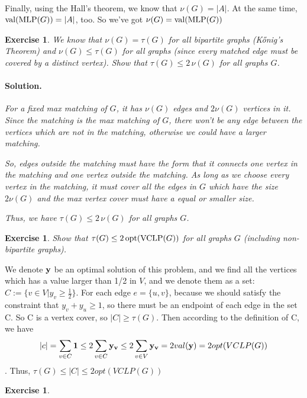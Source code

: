 \documentclass[12pt,a4]{article}
\newtheorem{exercise}[theorem]{Exercise}
\begin{document}
\paragraph{}Finally, using the Hall's theorem, we know that $\nu(G) = |A|$. At the same time, $ \textnormal{val}(\textrm{MLP}(G)) = |A|$, too. So we've got $\nu(G) = \textnormal{val}(\textrm{MLP}(G))$
\begin{exercise}
  We know that $\nu(G) = \tau(G)$ for all bipartite graphs (K\H{o}nig's Theorem) and
  $\nu(G) \leq \tau(G)$ for all graphs (since every matched edge must be covered
  by a distinct vertex). Show that $\tau(G) \leq 2 \, \nu(G)$ for all graphs $G$.   
  
\paragraph{Solution.}

For a fixed max matching of $G$, it has $\nu(G)$ edges and $2\nu(G)$ vertices in it. Since the matching is the max matching of $G$, there won't be any edge between the vertices which are not in the matching, otherwise we could have a larger matching. 

So, edges outside the matching must have the form that it connects one vertex in the matching and one vertex outside the matching. As long as we choose every vertex in the matching, it must cover all the edges in $G$ which have the size $2\nu(G)$ and the max vertex cover must have a equal or smaller size.

Thus, we have $\tau(G) \leq 2 \, \nu(G)$ for all graphs $G$.

\end{exercise}

\begin{exercise}
   Show that $\tau(G) \leq 2\, \textup{\textrm{opt}}(\textrm{VCLP}(G))$ for all graphs $G$ (including non-bipartite graphs).
\end{exercise}
    We denote $\mathbf{y}$ be an optimal solution of this problem, and we find all the vertices which has a value larger than 1/2 in $V$, and we denote them as a set: $C:=\{v \in V | y_v \ge \frac{1}{2}\}$. For each edge $e = \{u, v\}$, because we should satisfy the constraint that $y_v + y_u \ge 1$, so there must be an endpoint of each edge in the set C. So C is a vertex cover, so $|C| \ge \tau (G)$.
    Then according to the definition of C, we have
    $$|c|=\sum_{v\in C}\mathbf{1} \le 2\sum_{v\in C}\mathbf{y_v} \le 2\sum_{v\in V}\mathbf{y_v} = 2val(\mathbf{y}) = 2 opt(VCLP(G))$$.
    Thus, $\tau(G) \le |C| \le 2 opt(VCLP(G))$
\begin{exercise}
\end{exercise}
\end{document}
